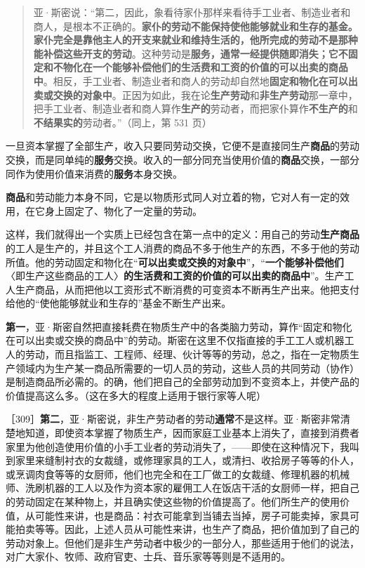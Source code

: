 \begin{quote}亚·斯密说：“第二，因此，象看待家仆那样来看待手工业者、制造业者和商人，是根本不正确的。\textbf{家仆的劳动不能保持使他能够就业和生存的基金。家仆完全是靠他主人的开支来就业和维持生活的，他所完成的劳动不是那种能补偿这些开支的劳动}。这种劳动是\textbf{服务，通常一经提供随即消失；它不固定和不物化在一个能够补偿他们的生活费和工资的价值的可以出卖的商品中}。相反，手工业者、制造业者和商人的劳动却自然地\textbf{固定和物化在可以出卖或交换的对象中}。正因为如此，我在论\textbf{生产劳动}和\textbf{非生产劳动}那一章中，把手工业者、制造业者和商人算作\textbf{生产的}劳动者，而把家仆算作\textbf{不生产的}和\textbf{不结果实的}劳动者。”（同上，第 531 页）\end{quote}

一旦资本掌握了全部生产，收入只要同劳动交换，它便不是直接同生产\textbf{商品}的劳动交换，而是同单纯的\textbf{服务}交换。收入的一部分同充当使用价值的\textbf{商品}交换，一部分同作为使用价值来消费的\textbf{服务}本身交换。

\textbf{商品}和劳动能力本身不同，它是以物质形式同人对立着的物，它对人有一定的效用，在它身上固定了、物化了一定量的劳动。

这样，我们就得出一个实质上已经包含在第一点中的定义：用自己的劳动\textbf{生产商品}的工人是生产的，并且这个工人消费的商品不多于他生产的东西，不多于他的劳动所值。他的劳动固定和物化在“\textbf{可以出卖或交换的对象中}”，“\textbf{一个能够补偿他们}〈即生产这些商品的工人〉\textbf{的生活费和工资的价值的可以出卖的商品中}”。生产工人生产商品，从而把他以工资形式不断消费的可变资本不断再生产出来。他把支付给他的“使他能够就业和生存的”基金不断生产出来。

\textbf{第一}，亚·斯密自然把直接耗费在物质生产中的各类脑力劳动，算作“固定和物化在可以出卖或交换的商品中”的劳动。斯密在这里不仅指直接的手工工人或机器工人的劳动，而且指监工、工程师、经理、伙计等等的劳动，总之，指在一定物质生产领域内为生产某一商品所需要的一切人员的劳动，这些人员的共同劳动（协作）是制造商品所必需的。的确，他们把自己的全部劳动加到不变资本上，并使产品的价值提高这么多。（这在多大的程度上适用于银行家等人呢）

［309］\textbf{第二}，亚·斯密说，非生产劳动者的劳动\textbf{通常}不是这样。亚·斯密非常清楚地知道，即使资本掌握了物质生产，因而家庭工业基本上消失了，直接到消费者家里为他创造使用价值的小手工业者的劳动消失了，——即使在这种情况下，我叫到家里来缝制衬衣的女裁缝，或修理家具的工人，或清扫、收拾房子等等的仆人，或烹调肉食等等的女厨师，他们也完全和在工厂做工的女裁缝、修理机器的机械师、洗刷机器的工人以及作为资本家的雇佣工人在饭店干活的女厨师一样，把自己的劳动固定在某种物上，并且确实使这些物的价值提高了。他们所生产的使用价值，从可能性来讲，也是商品：衬衣可能拿到当铺去当掉，房子可能卖掉，家具可能拍卖等等。因此，上述人员从可能性来讲，也生产了商品，把价值加到了自己的劳动对象上。但他们是非生产劳动者中极少的一部分人，那些适用于他们的说法，对广大家仆、牧师、政府官吏、士兵、音乐家等等则是不适用的。

